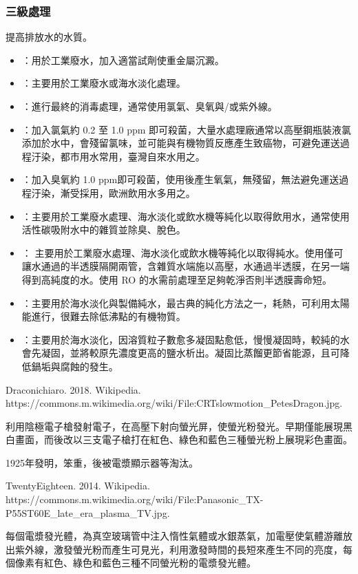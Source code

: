 \documentclass[a4paper,12pt]{report}
\begin{document}
\begin{itemize}
\subsubsection{三級處理}
提高排放水的水質。
\begin{itemize}
\item {}：用於工業廢水，加入適當試劑使重金屬沉澱。
\item {}：主要用於工業廢水或海水淡化處理。
\item {}：進行最終的消毒處理，通常使用氯氣、臭氧與/或紫外線。
\bit
\item {}：加入氯氣約 0.2 至 1.0 ppm 即可殺菌，大量水處理廠通常以高壓鋼瓶裝液氯添加於水中，會殘留氯味，並可能與有機物質反應產生致癌物，可避免運送過程汙染，都市用水常用，臺灣自來水用之。
\item {}：加入臭氧約 1.0 ppm即可殺菌，使用後產生氧氣，無殘留，無法避免運送過程汙染，漸受採用，歐洲飲用水多用之。
\eit
\item {}：主要用於工業廢水處理、海水淡化或飲水機等純化以取得飲用水，通常使用活性碳吸附水中的雜質並除臭、脫色。
\item {}： 主要用於工業廢水處理、海水淡化或飲水機等純化以取得純水。使用僅可讓水通過的半透膜隔開兩管，含雜質水端施以高壓，水通過半透膜，在另一端得到高純度的水。使用 RO 的水需前處理至足夠乾淨否則半透膜壽命短。
\item {}：主要用於海水淡化與製備純水，最古典的純化方法之一，耗熱，可利用太陽能進行，很難去除低沸點的有機物質。
\item {}：主要用於海水淡化，因溶質粒子數愈多凝固點愈低，慢慢凝固時，較純的水會先凝固，並將較原先濃度更高的鹽水析出。凝固比蒸餾更節省能源，且可降低鍋垢與腐蝕的發生。
\end{itemize}
\bct\bfH\ctr{}\caption{Draconichiaro. 2018. Wikipedia.
\\https://commons.m.wikimedia.org/wiki/File:CRTslowmotion\_PetesDragon.jpg.}\ef\FB\ect
利用陰極電子槍發射電子，在高壓下射向螢光屏，使螢光粉發光。早期僅能展現黑白畫面，而後改以三支電子槍打在紅色、綠色和藍色三種螢光粉上展現彩色畫面。

1925年發明，笨重，後被電漿顯示器等淘汰。
\bct\bfH\ctr{}\caption{TwentyEighteen. 2014. Wikipedia. https://commons.m.wikimedia.org/wiki/File:Panasonic\_TX-P55ST60E\_late\_era\_plasma\_TV.jpg.}\ef\FB\ect
每個電漿發光體，為真空玻璃管中注入惰性氣體或水銀蒸氣，加電壓使氣體游離放出紫外線，激發螢光粉而產生可見光，利用激發時間的長短來產生不同的亮度，每個像素有紅色、綠色和藍色三種不同螢光粉的電漿發光體。


\end{itemize}
\end{document}
